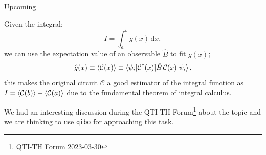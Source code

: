 \documentclass[8pt, xcolor={svgnames}, hyperref={colorlinks,linkcolor=black, citecolor=black, urlcolor=black}]{beamer}
\begin{document}
\begin{frame}{Upcoming}

\begin{tcolorbox}[colback=blue!15, title=   \faTerminal\,\, \texttt{WORK 4:} Quantum Analytical integration using the parameter shift rule.]
Given the integral:
\begin{equation}
I = \int_a^b g(x)\, \text{d}x,
\end{equation}
we can use the expectation value of an observable $\hat{B}$ 
to fit $g(x)$;
\begin{equation}
    \hat{g}(x) \equiv \braket{\mathcal{C}(x)} \equiv \braket{\psi_i|\mathcal{C}^{\dagger}(x) |
    \hat{B}\, \mathcal{C}(x)| \psi_i},
\end{equation}
this makes the original circuit $\mathcal{C}$ a good 
estimator of the integral function as $I = \braket{\mathcal{C}(b)}- \braket{\mathcal{C}(a)}$ 
due to the fundamental theorem of integral calculus.
\end{tcolorbox}

\begin{tcolorbox}[colback=red!15, title=\faTerminal\,\, \texttt{WORK 5:} How to classify HEP event topology
using a quantum annealer?]
We had an interesting discussion during the QTI-TH Forum\footnote{\href{https://indico.cern.ch/event/1267029/}{QTI-TH Forum 2023-03-30}}
about the topic and we are thinking to use \texttt{qibo} for approaching this task. 
\end{tcolorbox}
\end{frame}
\end{document}

